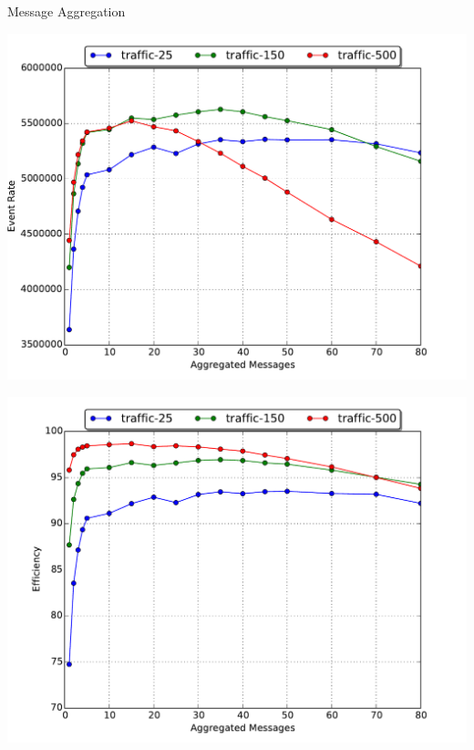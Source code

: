 \documentclass[10pt]{beamer}
\begin{document}
\begin{frame}{Message Aggregation}
    \begin{minipage}{0.5\textwidth}
        \includegraphics[width=\textwidth]{../figs/partitioning_communication/aggregate_traffic_eventrate.pdf}
    \end{minipage}%
    \begin{minipage}{0.5\textwidth}
        \includegraphics[width=\textwidth]{../figs/partitioning_communication/aggregate_traffic_efficiency.pdf}
    \end{minipage}   
\end{frame}
\end{document}
